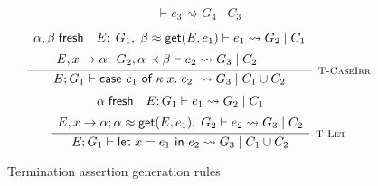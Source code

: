 \begin{figure}
\[{\begin{array}{c}
                    \vdash e_3 \rightsquigarrow G_4\; |\; C_3
            \end{array}
        }
    \]
    \vspace{0.5pt}
    \[
        \infer[\textsc{\footnotesize T-CaseIrr}]{
            E; G_1 \vdash \textsf{case } e_1 \textsf{ of } \kappa\; x.\; e_2\; 
                \rightsquigarrow G_3\; |\; C_1 \cup C_2
        }{
            \begin{array}{c}
                \alpha, \beta\; \textsf{fresh}
                \hspace{1em}
                E;\; G_1,\; \beta \teq \textsf{get}(E, e_1)  \vdash e_1 
                    \rightsquigarrow G_2\; |\; C_1 \\[5pt]
                E, x \rightarrow \alpha;\; G_2, \alpha \tlt \beta 
                    \vdash e_2 \rightsquigarrow G_3\; |\; C_2
                \hspace{2em}
            \end{array}
        }
    \]
    \vspace{0.5pt}
    \[
        \infer[\textsc{\footnotesize T-Let}]{
            E; G_1 \vdash \textsf{let } x = e_1 \textsf{ in } e_2
                \rightsquigarrow G_3\; |\; C_1 \cup C_2
        }{
            \begin{array}{c}
                \alpha \; \textsf{fresh}
                \hspace{1em}
                E; G_1 \vdash e_1 \rightsquigarrow G_2\; |\; C_1 \\[5pt]
                E, x \rightarrow \alpha; \alpha \teq \textsf{get}(E, e_1),\; G_2 \vdash e_2 
                    \rightsquigarrow G_3\; |\; C_2
            \end{array}
        }
    \]
    \caption{Termination assertion generation rules}
    \label{fig:terminationassertiongen}
\end{figure}

